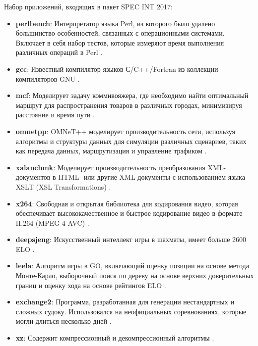 Набор приложений, входящих в пакет SPEC INT 2017:
\begin{itemize}
		\item  \textbf{perlbench}:  Интерпретатор языка Perl, из которого было удалено большинство особенностей, связанных с операционными системами. Включает в себя набор тестов, которые измеряют время выполнения различных операций в Perl \cite{siever1998perl}.
		\item  \textbf{gcc}: Известный компилятор языков С/C++/Fortran из коллекции компиляторов GNU \cite{gough2004introduction}. 
		\item  \textbf{mcf}: Моделирует задачу коммивояжера, где необходимо найти оптимальный маршрут для распространения товаров в различных городах, минимизируя расстояние и время пути \cite{lobel1999solving}.
		\item  \textbf{omnetpp}: OMNeT++ моделирует производительность  сети, используя алгоритмы и структуры данных для симуляции различных сценариев, таких как передача данных, маршрутизация и управление трафиком \cite{varga2019practical}.
		\item  \textbf{xalancbmk}: Моделирует производительность преобразования XML-документов в HTML- или другие XML-документы с использованием языка XSLT (XSL Transformations) \cite{euzenat2002xml}.
		\item  \textbf{x264}: Свободная и открытая библиотека для кодирования видео, которая обеспечивает высококачественное и быстрое кодирование видео в формате H.264 (MPEG-4 AVC) \cite{merritt2006x264}.
		\item  \textbf{deepsjeng}: Искусственный интеллект игры в шахматы, имеет больше 2600 ELO  \cite{sandin2021ssdf}.
		\item  \textbf{leela}: Алгоритм игры в GO, включающий оценку позиции на основе метода Монте-Карло, выборочный поиск по дереву на основе верхних доверительных границ и оценку хода на основе рейтингов ELO \cite{choi2022does} .
		\item  \textbf{exchange2}: Программа, разработанная для генерации нестандартных и сложных судоку. Использовался на неофициальных соревнованиях, которые могли длиться несколько дней \cite{10.1145/1124708.1124709}. 
		\item  \textbf{xz}: Содержит компрессионный и декомпрессионный алгоритмы \cite{koranne2011compression}. 
\end{itemize}

